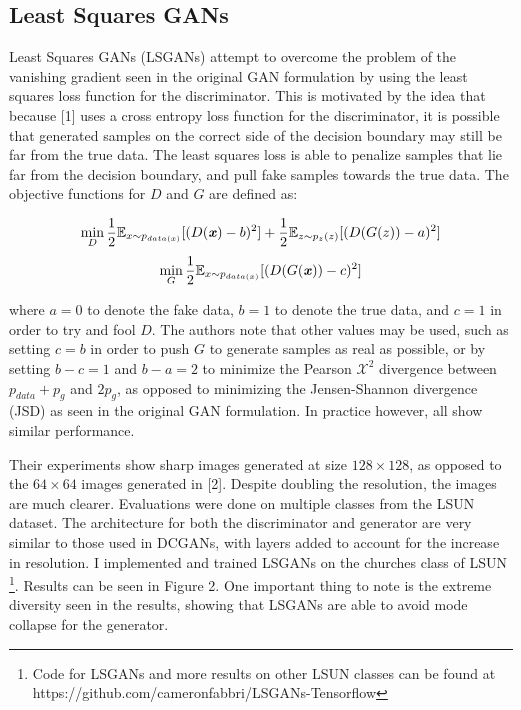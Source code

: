 \documentclass[9pt]{article}
\begin{document}
\subsection{Least Squares GANs}
Least Squares GANs (LSGANs) attempt to overcome the problem of the vanishing gradient seen in the original GAN formulation by using the least squares loss function for the
discriminator. This is motivated by the idea that because [1] uses a cross entropy loss function for the discriminator, it is possible that generated samples on the correct side of the
decision boundary may still be far from the true data. The least squares loss is able to penalize samples that lie far from the decision boundary, and pull fake samples towards the
true data. The objective functions for $D$ and $G$ are defined as:

\[\min\limits_{D} \frac{1}{2} \mathbb{E}_{x \sim p_{data(x)}} [(D(\textbf{\textit{x}})-b)^2] + \frac{1}{2} \mathbb{E}_{z \sim p_z(z)}[(D(G(z)) - a)^2]\]
\[\min\limits_{G} \frac{1}{2} \mathbb{E}_{x \sim p_{data(x)}} [(D(G(\textbf{\textit{x}}))-c)^2] \]

\noindent where $a=0$ to denote the fake data, $b=1$ to denote the true data, and $c=1$ in order to try and fool $D$. The authors note that other values
may be used, such as setting $c=b$ in order to push $G$ to generate samples as real as possible, or by setting $b-c=1$ and $b-a=2$ to minimize the Pearson
$\mathcal{X}^2$ divergence between $p_{data}+p_g$ and $2p_g$, as opposed to minimizing the Jensen-Shannon divergence (JSD) as seen in the original GAN
formulation. In practice however, all show similar performance. \newline

\noindent Their experiments show sharp images generated at size $128\times128$, as opposed to the $64\times64$ images generated in [2]. Despite doubling
the resolution, the images are much clearer. Evaluations were done on multiple classes from the LSUN dataset. The architecture for both the discriminator
and generator are very similar to those used in DCGANs, with layers added to account for the increase in resolution. I implemented and trained LSGANs on the churches
class of LSUN \footnote{Code for LSGANs and more results on other LSUN classes can be found at https://github.com/cameronfabbri/LSGANs-Tensorflow}.
Results can be seen in Figure 2.
One important thing to note is the extreme diversity seen in the results, showing that LSGANs are able to avoid mode collapse for the generator.
\end{document}
